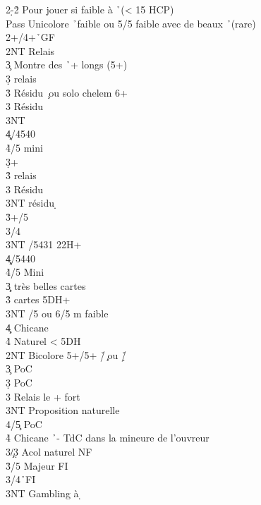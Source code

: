 \documentclass[a4paper]{article}
\begin{document}
\begin{bidtable}
2\d-2\h \> Pour jouer si faible à \h\ (< 15 HCP)\+\\
Pass \> Unicolore \h\ faible ou 5/5 faible avec de beaux \h\ (rare)\\
2\s {}+\s /4+\h\ GF\+\\
2NT \> Relais\+\\
3\c \> Montre des \h\ + longs (5+)\+\\
3\d \> relais\+\\
3\h \> Résidu \c\ ou solo chelem 6+\\
3\s \> Résidu \d \\
3NT \\
4\c\d {}/4540\\
4\h {}/5 mini\-\-\\
3\d {}+ \s \+\\
3\h \> relais\+\\
3\s \> Résidu \c \\
3NT \> résidu \d \-\-\\
3\h {}+/5\\
3\s {}/4\\
3NT /5431 22H+\\
4\c\d {}/5440\\
4\h {}/5 Mini\-\\
3\c\d {} très belles cartes\\
3\h\s {} cartes 5DH+\\
3NT /5 ou 6/5 m faible\\
4\c\d \> Chicane\\
4\h\s \> Naturel < 5DH\-\\
2NT \> Bicolore 5+/5+ \h /\c\ ou \h /\d \+\\
3\c \> PoC\\
3\d \> PoC\\
3\s \> Relais le + fort\\
3NT \> Proposition naturelle\\
4/5\c \> PoC\\
4\h \> Chicane \h\ - TdC dans la mineure de l'ouvreur\-\\
3\c/3\d \> Acol naturel NF\\
3\h {}/5 Majeur FI\\
3\s {}\s /4\h\ FI\\
3NT \> Gambling à \d \-
\end{bidtable}
\end{document}
